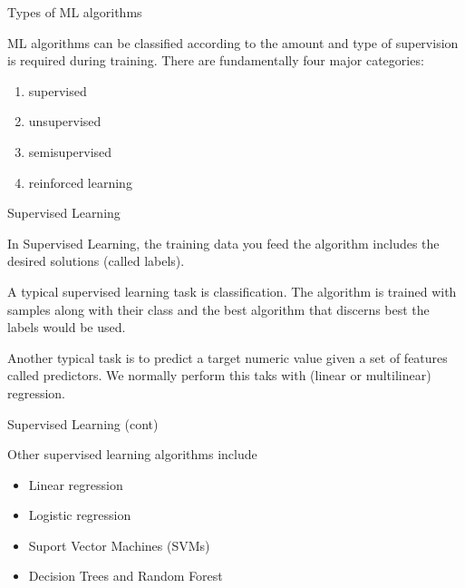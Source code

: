 \documentclass{beamer}
\begin{document}
\begin{frame}{Types of ML algorithms}
	
	
	ML algorithms can be classified according to the amount and type of supervision is required during training. There are fundamentally four major categories: 
	\begin{enumerate}
		\item supervised
		\item unsupervised
		\item semisupervised
		\item reinforced learning
	\end{enumerate}
	
\end{frame}

\begin{frame}{Supervised Learning}
	
	In Supervised Learning, the training data you feed the algorithm includes the desired solutions (called labels).
	
	A typical supervised learning task is classification. The algorithm is trained with samples along with their class and the best algorithm that discerns best the labels would be used.
	
	Another typical task is to predict a target numeric value given a set of features called predictors. We normally perform this taks with (linear or multilinear) regression.

\end{frame}


\begin{frame}{Supervised Learning (cont)}
	
	
	Other supervised learning algorithms include
	\begin{itemize}
		\item 	Linear regression
		\item 	Logistic regression
		\item 	Suport Vector Machines (SVMs)
		\item 	Decision Trees and Random Forest
	\end{itemize}


\end{frame}
\end{document}
